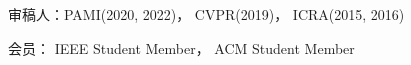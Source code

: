 
\begin{cvparagraph}

审稿人：PAMI(2020, 2022)， CVPR(2019)， ICRA(2015, 2016)

会员： IEEE Student Member， ACM Student Member
\end{cvparagraph}
